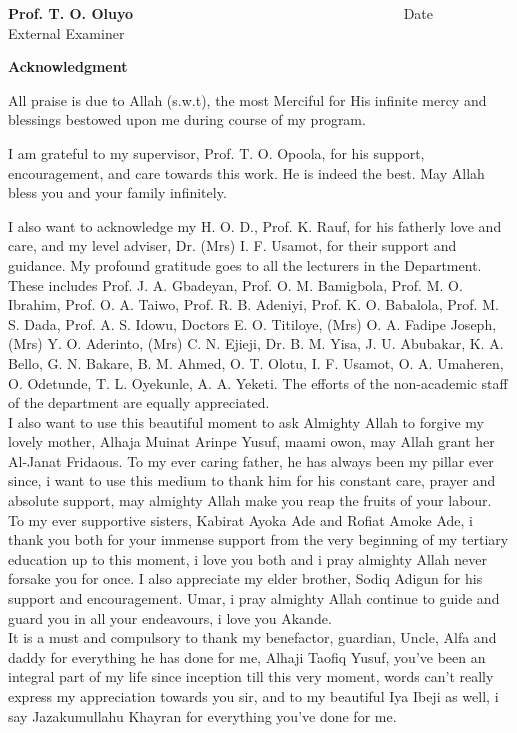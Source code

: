 \documentclass[a4paper, 12pt]{report}
\begin{document}
{\small \textbf{Prof. T. O. Oluyo} $\quad\qquad\quad\qquad\qquad\qquad\qquad\qquad\qquad\qquad\quad$Date\\
External Examiner

\np
\begin{center}      \textbf{\upshape Acknowledgment } 		             \end{center}
All praise is due to Allah (s.w.t), the most Merciful for His infinite mercy and blessings bestowed upon me during course of my program.

I am grateful to my supervisor, Prof. T. O. Opoola,  for his support, encouragement, and care towards this work. He is indeed the best. May Allah bless you and your family infinitely.


I also want to acknowledge my H. O. D., Prof. K. Rauf, for his fatherly love and care, and my level adviser, Dr. (Mrs) I. F. Usamot, for their support and guidance. My profound gratitude goes to all the lecturers in the Department. These includes Prof. J. A. Gbadeyan, Prof. O. M. Bamigbola, Prof. M. O. Ibrahim, Prof. O. A. Taiwo, Prof. R. B. Adeniyi, Prof. K. O. Babalola, Prof. M. S. Dada, Prof. A. S. Idowu, Doctors E. O. Titiloye, (Mrs) O. A. Fadipe Joseph, (Mrs) Y. O. Aderinto,  (Mrs) C. N. Ejieji, Dr. B. M.  Yisa, J. U. Abubakar, K. A. Bello, G. N. Bakare, B. M. Ahmed, O. T. Olotu, I. F. Usamot, O. A. Umaheren, O. Odetunde, T. L. Oyekunle, A. A. Yeketi. The efforts of the non-academic staff of the department are equally appreciated.\\
I also want to use this beautiful moment to ask Almighty Allah to forgive my lovely mother, Alhaja Muinat Arinpe Yusuf, maami owon, may Allah grant her Al-Janat Fridaous. To my ever caring father, he has always been my pillar ever since, i want to use this medium to thank him for his constant care, prayer and absolute support, may almighty Allah make you reap the fruits of your labour.\\
To my ever supportive sisters, Kabirat Ayoka Ade and Rofiat Amoke Ade, i thank you both for your immense support from the very beginning of my tertiary education up to this moment, i love you both and i pray almighty Allah never forsake you for once. I also appreciate my elder brother, Sodiq Adigun for his support and encouragement. Umar, i pray almighty Allah continue to guide and guard you in all your endeavours, i love you Akande.\\
It is a must and compulsory to thank my benefactor, guardian, Uncle, Alfa and daddy for everything he has done for me, Alhaji Taofiq Yusuf, you've been an integral part of my life since inception till this very moment, words can't really express my appreciation towards you sir, and to my beautiful Iya Ibeji as well, i say Jazakumullahu Khayran for everything you've done for me.\\
}
\end{document}
